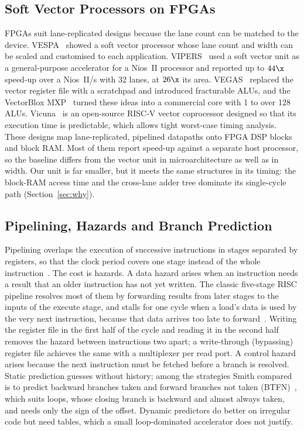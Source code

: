 \subsection{Soft Vector Processors on FPGAs}
FPGAs suit lane-replicated designs because the lane count can be matched to the device.
VESPA~\cite{vespa} showed a soft vector processor whose lane count and width can be
scaled and customised to each application. VIPERS~\cite{vipers} used a soft vector unit
as a general-purpose accelerator for a Nios~II processor and reported up to $44\x$
speed-up over a Nios~II/s with 32 lanes, at $26\x$ its area. VEGAS~\cite{vegas}
replaced the vector register file with a scratchpad and introduced fracturable ALUs,
and the VectorBlox MXP~\cite{mxp} turned these ideas into a commercial core with 1 to
over 128 ALUs. Vicuna~\cite{vicuna} is an open-source RISC-V vector coprocessor designed
so that its execution time is predictable, which allows tight worst-case timing
analysis. These designs map lane-replicated, pipelined datapaths onto FPGA DSP blocks
and block RAM. Most of them report speed-up against a separate host processor, so the
baseline differs from the vector unit in microarchitecture as well as in width. Our
unit is far smaller, but it meets the same structures in its timing: the block-RAM
access time and the cross-lane adder tree dominate its single-cycle path
(Section~\ref{sec:why}).

\subsection{Pipelining, Hazards and Branch Prediction}
Pipelining overlaps the execution of successive instructions in stages separated by
registers, so that the clock period covers one stage instead of the whole
instruction~\cite{hp6, pattersonrv}. The cost is hazards. A data hazard arises when an
instruction needs a result that an older instruction has not yet written. The classic
five-stage RISC pipeline resolves most of them by forwarding results from later stages
to the inputs of the execute stage, and stalls for one cycle when a load's data is used
by the very next instruction, because that data arrives too late to
forward~\cite{pattersonrv}. Writing the register file in the first half of the cycle
and reading it in the second half removes the hazard between instructions two apart; a
write-through (bypassing) register file achieves the same with a multiplexer per read
port. A control hazard arises because the next instruction must be fetched before a
branch is resolved. Static prediction guesses without history; among the strategies
Smith compared is to predict backward branches taken and forward branches not taken
(BTFN)~\cite{smith81}, which suits loops, whose closing branch is backward and almost
always taken, and needs only the sign of the offset. Dynamic predictors do better on
irregular code but need tables, which a small loop-dominated accelerator does not
justify.

